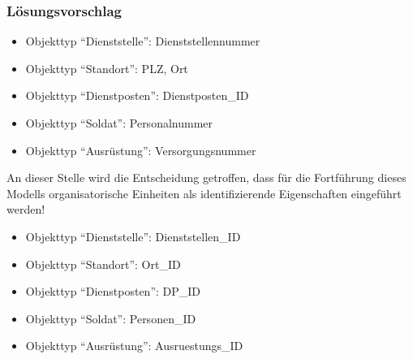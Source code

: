         \subsubsection{L\"osungsvorschlag}
          \begin{itemize}
            \item Objekttyp \enquote{Dienststelle}: Dienststellennummer
            \item Objekttyp \enquote{Standort}: PLZ, Ort
            \item Objekttyp \enquote{Dienstposten}: Dienstposten\_ID
            \item Objekttyp \enquote{Soldat}: Personalnummer
            \item Objekttyp \enquote{Ausr\"ustung}: Versorgungsnummer
          \end{itemize}
          An dieser Stelle wird die Entscheidung getroffen, dass f\"ur die Fortf\"uhrung dieses Modells organisatorische Einheiten als identifizierende Eigenschaften eingef\"uhrt werden!
          \begin{itemize}
            \item Objekttyp \enquote{Dienststelle}: Dienststellen\_ID
            \item Objekttyp \enquote{Standort}: Ort\_ID
            \item Objekttyp \enquote{Dienstposten}: DP\_ID
            \item Objekttyp \enquote{Soldat}: Personen\_ID
            \item Objekttyp \enquote{Ausr\"ustung}: Ausruestungs\_ID
          \end{itemize}

